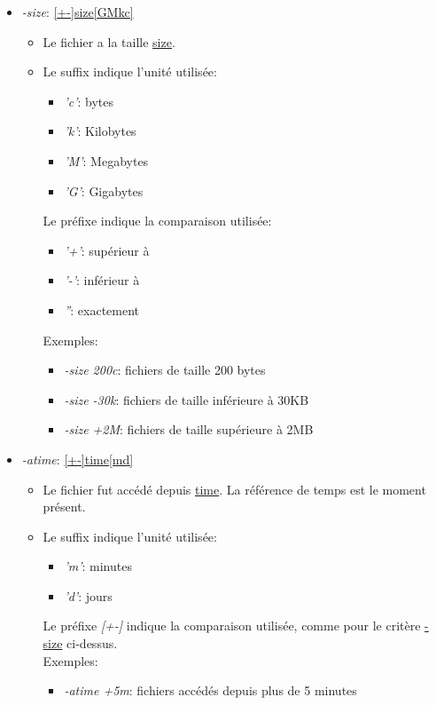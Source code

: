 \documentclass[11pt, a4paper]{article}
\begin{document}
\begin{itemize}
\begin{itemize}
	\end{itemize}
	\item \textit{-size}: \underline{[+-]size[GMkc]}
	\begin{itemize}
		\item 		Le fichier a la taille \underline{size}.
		\item 		Le suffix indique l'unité utilisée:
		\begin{itemize}
			\item \textit{'c'}: bytes
			\item \textit{'k'}: Kilobytes
			\item \textit{'M'}: Megabytes
			\item \textit{'G'}: Gigabytes
		\end{itemize}
		Le préfixe indique la comparaison utilisée:
		\begin{itemize}
			\item \textit{'+'}: supérieur à
			\item \textit{'-'}: inférieur à
			\item \textit{''}: exactement
		\end{itemize}
		Exemples:
		\begin{itemize}
			\item \textit{-size 200c}: fichiers de taille 200 bytes
			\item \textit{-size -30k}: fichiers de taille inférieure à 30KB
			\item \textit{-size +2M}: fichiers de taille supérieure à 2MB
		\end{itemize}
	\end{itemize}
	\item \textit{-atime}: \underline{[+-]time[md]}
	\begin{itemize}
		\item	Le fichier fut accédé depuis \underline{time}. La référence de temps est le moment présent.
		\item	Le suffix indique l'unité utilisée:
		\begin{itemize}
			\item \textit{'m'}: minutes
			\item \textit{'d'}: jours
		\end{itemize}
		Le préfixe \textit{[+-]} indique la comparaison utilisée, comme pour le critère \underline{-size} ci-dessus.\\
		Exemples:
		\begin{itemize}
			\item \textit{-atime +5m}: fichiers accédés depuis plus de 5 minutes

\end{itemize}
\end{itemize}
\end{itemize}
\end{document}
